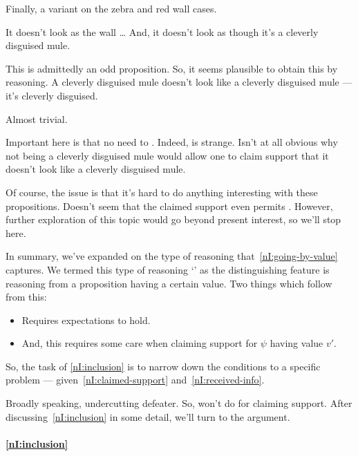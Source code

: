 \begin{note}
  Finally, a variant on the zebra and red wall cases.

  It doesn't look as the wall \dots
  And, it doesn't look as though it's a cleverly disguised mule.

  This is admittedly an odd proposition.
  So, it seems plausible to obtain this by reasoning.
  A cleverly disguised mule doesn't look like a cleverly disguised mule --- it's cleverly disguised.

  Almost trivial.

  Important here is that no need to \RBV{}.
  Indeed, \RBV{} is strange.
  Isn't at all obvious why not being a cleverly disguised mule would allow one to claim support that it doesn't look like a cleverly disguised mule.

  Of course, the issue is that it's hard to do anything interesting with these propositions.
  Doesn't seem that the claimed support even permits \RBV{}.
  However, further exploration of this topic would go beyond present interest, so we'll stop here.
\end{note}

\begin{note}[Summary]
  In summary, we've expanded on the type of reasoning that~\ref{nI:going-by-value} captures.
  We termed this type of reasoning `\RBV{-}' as the distinguishing feature is reasoning from a proposition having a certain value.
  Two things which follow from this:
  \begin{itemize}
  \item Requires expectations to hold.
  \item And, this requires some care when claiming support for \(\psi\) having value \(v'\).
  \end{itemize}
  So, the task of \ref{nI:inclusion} is to narrow down the conditions to a specific problem --- given~\ref{nI:claimed-support} and~\ref{nI:received-info}.

  Broadly speaking, {\color{red} undercutting defeater}.
  So, \RBV{} won't do for claiming support.
  After discussing~\ref{nI:inclusion} in some detail, we'll turn to the argument.
\end{note}

\paragraph{\ref{nI:inclusion}}

